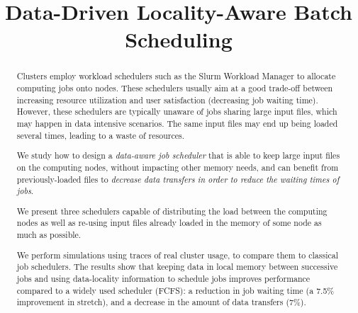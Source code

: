 \documentclass[conference]{IEEEtran}
\begin{document}
\title{Data-Driven Locality-Aware Batch Scheduling}


\maketitle

\begin{abstract}
  Clusters employ workload schedulers such as
  the Slurm Workload Manager to allocate computing jobs onto
  nodes. These schedulers usually aim at a good trade-off between
  increasing resource utilization and user satisfaction (decreasing
  job waiting time). However, these schedulers are typically unaware
  of jobs sharing large input files, which may happen in data
  intensive scenarios. The same input files may end up being loaded several
  times, leading to a waste of resources.
   
  We study how to design a \textit{data-aware job scheduler} that is
  able to keep large input files on the computing nodes, without
  impacting other memory needs, and can benefit from previously-loaded files to
  \textit{decrease data transfers in order to reduce the waiting times of jobs}.

  We present three schedulers capable of distributing the load between
  the computing nodes as well as re-using input files already loaded
  in the memory of some node as much as possible.
  
  We perform simulations using traces of real cluster usage, to compare
  them to classical job schedulers. The results show that
  keeping data in local memory between successive jobs and using data-locality
  information to schedule jobs improves performance compared
  to a widely used scheduler (FCFS): a reduction in job waiting time
  (a 7.5\% improvement in stretch), and a decrease in the
  amount of data transfers (7\%).

\end{abstract}
\end{document}
